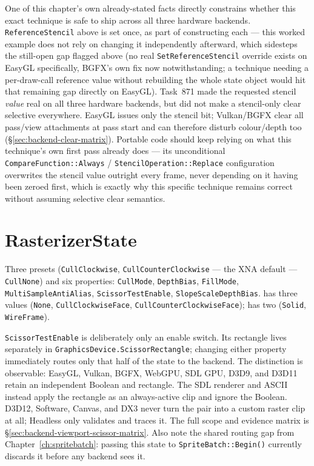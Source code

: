 One of this chapter's own already-stated facts directly constrains whether this exact
technique is safe to ship across all three hardware backends. \texttt{ReferenceStencil} above
is set once, as part of constructing each  --- this worked example
does not rely on changing it independently afterward, which sidesteps the still-open gap
flagged above (no real \texttt{SetReferenceStencil} override exists on EasyGL specifically,
BGFX's own fix now notwithstanding; a technique needing a per-draw-call reference value without
rebuilding the whole state object would hit that remaining gap directly on EasyGL). Task~871
made the requested stencil \emph{value} real on all three hardware backends, but did not make a
stencil-only clear selective everywhere. EasyGL issues only the stencil bit; Vulkan/BGFX clear
all pass/view attachments at pass start and can therefore disturb colour/depth too
(\S\ref{sec:backend-clear-matrix}). Portable code should keep relying on what this technique's
own first pass already does --- its unconditional
\texttt{CompareFunction::Always} / \texttt{StencilOperation::Replace} configuration overwrites
the stencil value outright every frame, never depending on it having been zeroed first, which
is exactly why this specific technique remains correct without assuming selective clear
semantics.

\section{RasterizerState}

Three presets (\texttt{CullClockwise}, \texttt{CullCounterClockwise} --- the XNA default ---
\texttt{CullNone}) and six properties: \texttt{CullMode}, \texttt{DepthBias},
\texttt{FillMode}, \texttt{MultiSampleAntiAlias}, \texttt{ScissorTestEnable},
\texttt{SlopeScaleDepthBias}.  has three values
(\texttt{None}, \texttt{CullClockwiseFace}, \texttt{CullCounterClockwiseFace});
 has two (\texttt{Solid}, \texttt{WireFrame}).

\texttt{ScissorTestEnable} is deliberately only an enable switch. Its rectangle lives
separately in \texttt{GraphicsDevice.ScissorRectangle}; changing either property immediately
routes only that half of the state to the backend. The distinction is observable: EasyGL,
Vulkan, BGFX, WebGPU, SDL GPU, D3D9, and D3D11 retain an independent Boolean and rectangle.
The SDL renderer and ASCII instead apply the rectangle as an always-active clip and ignore the
Boolean. D3D12, Software, Canvas, and DX3 never turn the pair into a custom raster clip at all;
Headless only validates and traces it. The full scope and evidence matrix is
\S\ref{sec:backend-viewport-scissor-matrix}. Also note the shared
 routing gap from Chapter~\ref{ch:spritebatch}: passing this state to
\texttt{SpriteBatch::Begin()} currently discards it before any backend sees it.

